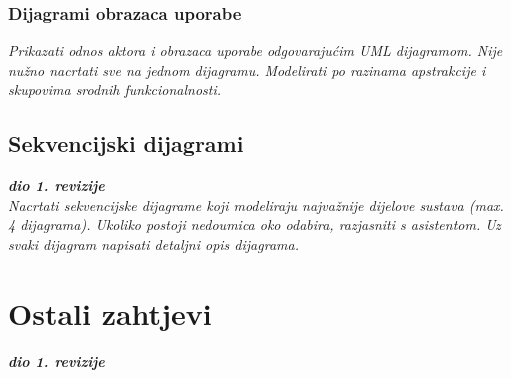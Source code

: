 					
				\subsubsection{Dijagrami obrazaca uporabe}
					
					\textit{Prikazati odnos aktora i obrazaca uporabe odgovarajućim UML dijagramom. Nije nužno nacrtati sve na jednom dijagramu. Modelirati po razinama apstrakcije i skupovima srodnih funkcionalnosti.}
				\eject		
				
			\subsection{Sekvencijski dijagrami}
				
				\textbf{\textit{dio 1. revizije}}\\
				
				\textit{Nacrtati sekvencijske dijagrame koji modeliraju najvažnije dijelove sustava (max. 4 dijagrama). Ukoliko postoji nedoumica oko odabira, razjasniti s asistentom. Uz svaki dijagram napisati detaljni opis dijagrama.}
				\eject
	
		\section{Ostali zahtjevi}
		
			\textbf{\textit{dio 1. revizije}}\\
		 
